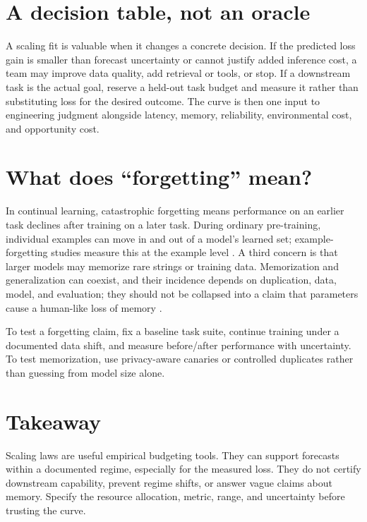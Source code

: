 \documentclass[11pt]{article}
\begin{document}
\section{A decision table, not an oracle}
A scaling fit is valuable when it changes a concrete decision. If the predicted loss gain is smaller than forecast uncertainty or cannot justify added inference cost, a team may improve data quality, add retrieval or tools, or stop. If a downstream task is the actual goal, reserve a held-out task budget and measure it rather than substituting loss for the desired outcome. The curve is then one input to engineering judgment alongside latency, memory, reliability, environmental cost, and opportunity cost.

\section{What does ``forgetting'' mean?}
In continual learning, catastrophic forgetting means performance on an earlier task declines after training on a later task. During ordinary pre-training, individual examples can move in and out of a model's learned set; example-forgetting studies measure this at the example level \cite{toneva2019empirical}. A third concern is that larger models may memorize rare strings or training data. Memorization and generalization can coexist, and their incidence depends on duplication, data, model, and evaluation; they should not be collapsed into a claim that parameters cause a human-like loss of memory \cite{biderman2023emergent}.

To test a forgetting claim, fix a baseline task suite, continue training under a documented data shift, and measure before/after performance with uncertainty. To test memorization, use privacy-aware canaries or controlled duplicates rather than guessing from model size alone.

\section{Takeaway}
Scaling laws are useful empirical budgeting tools. They can support forecasts within a documented regime, especially for the measured loss. They do not certify downstream capability, prevent regime shifts, or answer vague claims about memory. Specify the resource allocation, metric, range, and uncertainty before trusting the curve.

\end{document}
